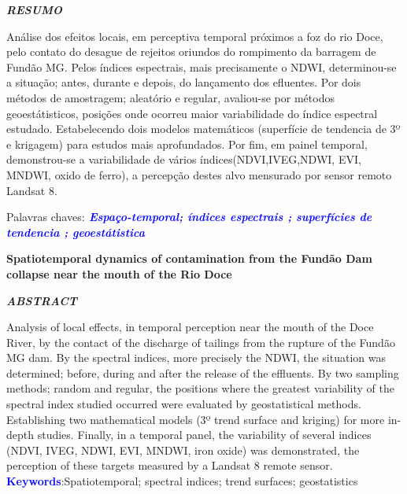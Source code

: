 
\begin{center}
	\textbf{\textit{RESUMO}}
\end{center}
\noindent Análise dos efeitos locais, em perceptiva temporal  próximos a foz do rio Doce, pelo contato do desague de rejeitos oriundos do rompimento da barragem de Fundão MG. Pelos índices espectrais, mais precisamente o NDWI, determinou-se  a situação; antes, durante e depois, do lançamento dos efluentes. Por dois métodos de amostragem; aleatório e regular, avaliou-se por métodos geoestátisticos, posições onde ocorreu maior variabilidade do índice espectral estudado. Estabelecendo dois modelos matemáticos (superfície de tendencia de 3º e krigagem) para estudos mais aprofundados. Por fim, em painel temporal, demonstrou-se a variabilidade de vários índices(NDVI,IVEG,NDWI, EVI, MNDWI, oxido de ferro), a percepção destes alvo mensurado por sensor remoto Landsat 8. 

\noindent Palavras chaves:\textbf{\textcolor{blue}{  \textit{ Espaço-temporal; índices espectrais  ;  superfícies de tendencia ; geoestátistica }  }}

\begin{center}
\textbf{Spatiotemporal dynamics of contamination from the Fundão Dam collapse near the mouth of the Rio Doce}
\end{center}
\begin{center}
	\textbf{\textit{ABSTRACT}}
\end{center}
\noindent  
\noindent  Analysis of local effects, in temporal perception near the mouth of the Doce River, by the contact of the discharge of tailings from the rupture of the Fundão MG dam. By the spectral indices, more precisely the NDWI, the situation was determined; before, during and after the release of the effluents. By two sampling methods; random and regular, the positions where the greatest variability of the spectral index studied occurred were evaluated by geostatistical methods. Establishing two mathematical models (3º trend surface and kriging) for more in-depth studies. Finally, in a temporal panel, the variability of several indices (NDVI, IVEG, NDWI, EVI, MNDWI, iron oxide) was demonstrated, the perception of these targets measured by a Landsat 8 remote sensor.
\noindent\textbf{\textcolor{blue}{ Keywords}}:Spatiotemporal; spectral indices; trend surfaces; geostatistics 

\begin{comment}
	\cite{Anderson}
	\cite{Anderson}\\
	\citep{Anderson}\\
	\citet{Anderson}\\
	\citealp{Anderson}, \\
	\citealt{Anderson}, \\
	\citeauthor{Anderson}, \\
	\citeyear{Anderson}, \\
	\citeyearpar{Anderson}, \\
	\citeauthor*{Anderson}, \\
	\citep*{Anderson}, \\
	\citet*{Tanimoto}
\end{comment}
 
